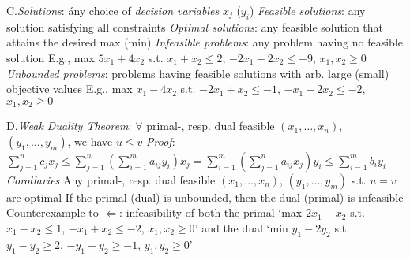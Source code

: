 \item{C.}\emph{Solutions}: \'any choice of \emph{decision variables} $x_j$
($y_i$)\smallskip
{}\emph{Feasible solutions}: any solution satisfying all constraints
\smallskip
{}\emph{Optimal solutions}: any feasible solution that attains the
desired max (min)\smallskip
{}\emph{Infeasible problems}: any problem having no feasible solution
\smallskip
{}E.g., max $5x_1+4x_2$ s.t. $x_1+x_2\leq 2$, $-2x_1-2x_2\leq-9$,
$x_1,x_2\geq 0$\smallskip
{}\emph{Unbounded problems}: problems having feasible solutions with
arb. large (small) objective values\smallskip
{}E.g., max $x_1-4x_2$ s.t. $-2x_1+x_2\leq -1$, $-x_1-2x_2\leq-2$,
$x_1,x_2\geq 0$\smallskip

\item{D.}\emph{Weak Duality Theorem}: $\forall$ primal-, resp. dual feasible
$(x_1,\ldots,x_n)$, $(y_1,\ldots,y_m)$, we have $u\leq v$\smallskip
{}\emph{Proof}: $\sum_{j=1}^nc_jx_j\leq\sum_{j=1}^n\left(\sum_{i=1}^m
a_{ij}y_i\right)x_j=\sum_{i=1}^m\left(\sum_{j=1}^na_{ij}x_j\right)y_i\leq
\sum_{i=1}^mb_iy_i$\smallskip
{}\emph{Corollaries}\smallskip
{}Any primal-, resp. dual feasible $(x_1,\ldots,x_n)$, $(y_1,\ldots,
y_m)$ s.t. $u=v$ are optimal\smallskip
{}If the primal (dual) is unbounded, then the dual (primal) is
infeasible\smallskip
{}Counterexample to $\Leftarrow$: infeasibility of both the primal
`max $2x_1-x_2$ s.t. $x_1-x_2\leq 1$, $-x_1+x_2\leq -2$, $x_1,x_2\geq 0$' and
the dual `min $y_1-2y_2$ s.t. $y_1-y_2\geq 2$, $-y_1+y_2\geq -1$, $y_1,y_2\geq
0$'\smallskip

\vfill\eject
